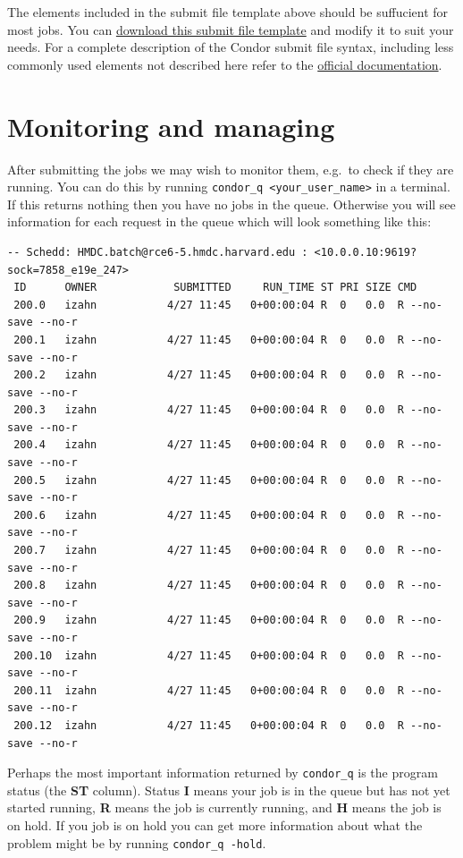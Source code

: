 \documentclass[
]{book}
\begin{document}
The elements included in the submit file template above should be
suffucient for most jobs. You can \href{template.submit}{download this submit file
template} and modify it to suit your needs. For a
complete description of the Condor submit file syntax, including less
commonly used elements not described here refer to the \href{https://htcondor.readthedocs.io/en/v8_8_3/man-pages/condor_submit.html}{official
documentation}.

\hypertarget{monitoring-and-managing}{%
\section{Monitoring and managing}\label{monitoring-and-managing}}

After submitting the jobs we may wish to monitor them, e.g.~to check if
they are running. You can do this by running \texttt{condor\_q\ \textless{}your\_user\_name\textgreater{}}
in a terminal. If this returns nothing then you have no jobs in the
queue. Otherwise you will see information for each request in the queue
which will look something like this:

\begin{verbatim}
-- Schedd: HMDC.batch@rce6-5.hmdc.harvard.edu : <10.0.0.10:9619?sock=7858_e19e_247>
 ID      OWNER            SUBMITTED     RUN_TIME ST PRI SIZE CMD
 200.0   izahn           4/27 11:45   0+00:00:04 R  0   0.0  R --no-save --no-r
 200.1   izahn           4/27 11:45   0+00:00:04 R  0   0.0  R --no-save --no-r
 200.2   izahn           4/27 11:45   0+00:00:04 R  0   0.0  R --no-save --no-r
 200.3   izahn           4/27 11:45   0+00:00:04 R  0   0.0  R --no-save --no-r
 200.4   izahn           4/27 11:45   0+00:00:04 R  0   0.0  R --no-save --no-r
 200.5   izahn           4/27 11:45   0+00:00:04 R  0   0.0  R --no-save --no-r
 200.6   izahn           4/27 11:45   0+00:00:04 R  0   0.0  R --no-save --no-r
 200.7   izahn           4/27 11:45   0+00:00:04 R  0   0.0  R --no-save --no-r
 200.8   izahn           4/27 11:45   0+00:00:04 R  0   0.0  R --no-save --no-r
 200.9   izahn           4/27 11:45   0+00:00:04 R  0   0.0  R --no-save --no-r
 200.10  izahn           4/27 11:45   0+00:00:04 R  0   0.0  R --no-save --no-r
 200.11  izahn           4/27 11:45   0+00:00:04 R  0   0.0  R --no-save --no-r
 200.12  izahn           4/27 11:45   0+00:00:04 R  0   0.0  R --no-save --no-r
\end{verbatim}

Perhaps the most important information returned by \texttt{condor\_q} is the
program status (the \textbf{ST} column). Status \textbf{I} means your job is in
the queue but has not yet started running, \textbf{R} means the job is
currently running, and \textbf{H} means the job is on hold. If you job is on
hold you can get more information about what the problem might be by
running \texttt{condor\_q\ -hold}.
\end{document}
